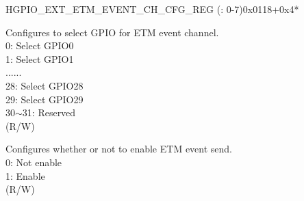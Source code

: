 \begin{register}{H}{GPIO\_EXT\_ETM\_EVENT\_CH\_CFG\_REG (: 0-7)}{0x0118+0x4*}\label{regdesc:GPIOEXTETMEVENTCHNCFGREG}
%
%
%
%
\regnewline%
\begin{regdesc}\begin{reglist}
\label{fielddesc:GPIOEXTETMCHNEVENTSEL}\item [GPIO\_EXT\_ETM\_CH\regindex{n}\_EVENT\_SEL] Configures to select GPIO for ETM event channel.\\
0: Select GPIO0\\
1: Select GPIO1\\
......\\
28: Select GPIO28\\
29: Select GPIO29\\
30$\sim$31: Reserved\\ (R/W)
\label{fielddesc:GPIOEXTETMCHNEVENTEN}\item [GPIO\_EXT\_ETM\_CH\regindex{n}\_EVENT\_EN] Configures whether or not to enable ETM event send.\\
0: Not enable\\
1: Enable\\ (R/W)
\end{reglist}\end{regdesc}
\end{register}


